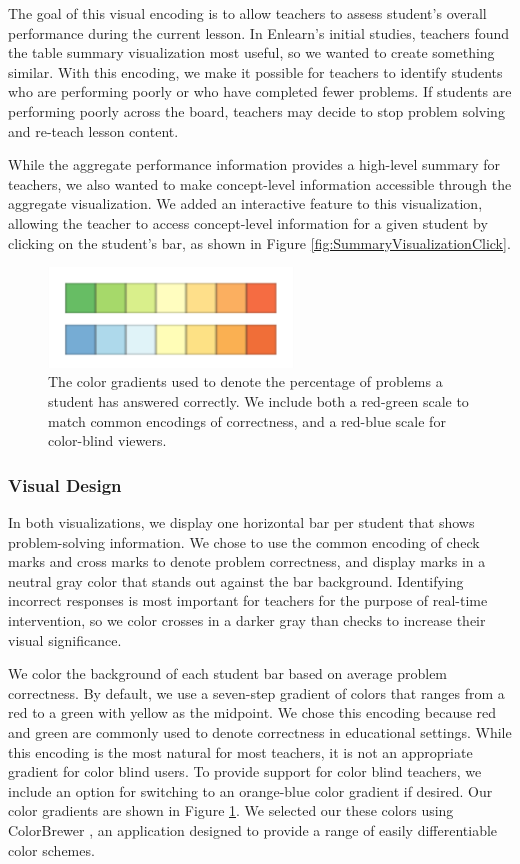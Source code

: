 \documentclass{sigchi}
\begin{document}
The goal of this visual encoding is to allow teachers to assess student's overall performance during the current lesson. In Enlearn's initial studies, teachers found the table summary visualization most useful, so we wanted to create something similar. With this encoding, we make it possible for teachers to identify students who are performing poorly or who have completed fewer problems. If students are performing poorly across the board, teachers may decide to stop problem solving and re-teach lesson content. 

While the aggregate performance information provides a high-level summary for teachers, we also wanted to make concept-level information accessible through the aggregate visualization. We added an interactive feature to this visualization, allowing the teacher to access concept-level information for a given student by clicking on the student's bar, as shown in Figure \ref{fig:SummaryVisualizationClick}.

\begin{figure}[t]
\centering
\includegraphics[width=65mm]{images/ColorGradients.pdf}
\caption{The color gradients used to denote the percentage of problems a student has answered correctly. We include both a red-green scale to match common encodings of correctness, and a red-blue scale for color-blind viewers.}
\label{fig:ColorGradients}
\end{figure}

\subsubsection{Visual Design}
In both visualizations, we display one horizontal bar per student that shows problem-solving information. We chose to use the common encoding of check marks and cross marks to denote problem correctness, and display marks in a neutral gray color that stands out against the bar background. Identifying incorrect responses is most important for teachers for the purpose of real-time intervention, so we color crosses in a darker gray than checks to increase their visual significance.

We color the background of each student bar based on average problem correctness. By default, we use a seven-step gradient of colors that ranges from a red to a  green with yellow as the midpoint. We chose this encoding because red and green are commonly used to denote correctness in educational settings. While this encoding is the most natural for most teachers, it is not an appropriate gradient for color blind users. To provide support for color blind teachers, we include an option for switching to an orange-blue color gradient if desired. Our color gradients are shown in Figure \ref{fig:ColorGradients}. We selected our these colors using ColorBrewer \cite{ColorBrewer}, an application designed to provide a range of easily differentiable color schemes.
\end{document}
